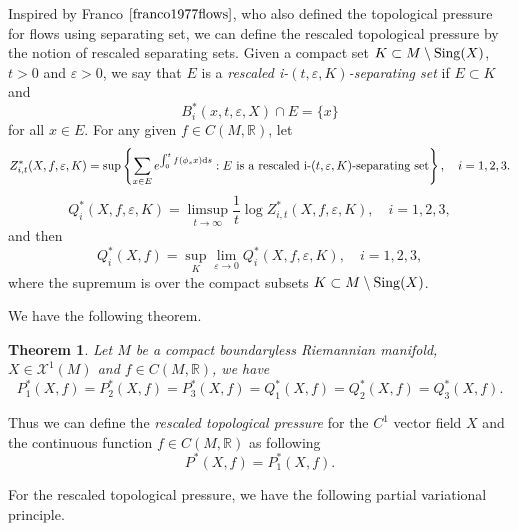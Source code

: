 \documentclass[10pt]{article}
\newtheorem{Theorem}{Theorem}[section]
\newtheorem*{Theorem A}{Theorem A}
\begin{document}
Inspired by Franco \(\cite{franco1977flows}\),  who also defined the topological pressure for flows using separating set, we can define the rescaled topological pressure by the notion of rescaled separating sets. Given a compact set \( K \subset M\setminus{\rm Sing}(X) \), \( t>0 \) and \( \varepsilon > 0 \), we say that \( E \) is a {\it rescaled i-\((t, \varepsilon, K) \)-separating set } if \( E \subset K \) and
\[ B_i^*(x, t, \varepsilon, X) \cap E = \{ x \} \]
for all \( x \in E \).  For any given $f\in C(M, \mathbb{R})$, let
\[
Z_{i,t}^*(X, f, \varepsilon,K) = \sup\left\{ \sum_{x \in E} e^{ \int_0^t f(\phi_s x) {\rm d}s} : E \text{ is a rescaled i-}(t,\varepsilon,K)\text{-separating set} \right\},\quad i=1,2,3.
\]
\[
{Q}_i^*(X, f, \varepsilon,K) = \limsup_{t \to \infty} \frac{1}{t} \log Z_{i,t}^*(X, f, \varepsilon,K),\quad i=1,2,3,
\]
and then
\[
{Q}_i^*(X, f) = \sup\limits_{K} \lim_{\varepsilon \to 0} {Q}_i^*(X, f, \varepsilon,K),\quad i=1,2,3,
\]
where the supremum is over the compact subsets \( K \subset M\setminus {\rm Sing}(X) \).

We have the following theorem.

\begin{Theorem}\label{theorem 1.3}
Let \( M \) be a compact boundaryless Riemannian manifold, $X\in\mathcal{X}^1(M)$ and $f\in C(M, \mathbb{R})$, we have
\[
{P}_1^*(X, f) = {P}_2^*(X, f)={P}_3^*(X,  f)={Q}_1^*(X, f) = {Q}_2^*(X, f)={Q}_3^*(X,  f).
\]
\end{Theorem}

Thus we can define the {\it rescaled topological pressure} for the $C^1$ vector field $X$ and the continuous function $f\in C(M, \mathbb{R})$ as following
$$P^*(X, f)={P}_1^*(X, f).$$

For the rescaled topological pressure, we have the following partial variational principle.
\end{document}
